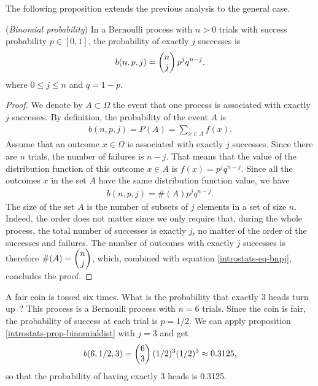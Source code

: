 The following proposition extends the previous analysis to the 
general case.

\begin{proposition}
(\emph{Binomial probability})
\label{introstats-prop-binomialdist}
In a Bernoulli process with $n>0$ trials with success probability $p\in[0,1]$, the probability
of exactly $j$ successes is 
\begin{eqnarray}
b(n,p,j) = \choosefun{n}{j} p^j q^{n-j},
\end{eqnarray}
where $0\leq j \leq n$ and $q=1-p$.
\end{proposition}

\begin{proof}
We denote by $A\subset \Omega$ the event that one process is associated with exactly $j$ successes. 
By definition, the probability of the event $A$ is 
\begin{eqnarray}
b(n,p,j) = P(A) = \sum_{x\in A} f(x).
\end{eqnarray}
Assume that an outcome $x\in \Omega$ is associated with exactly $j$ successes. Since there are 
$n$ trials, the number of failures is $n-j$. That means that the value of the distribution
function of this outcome $x\in A$ is $f(x) = p^j q^{n-j}$.
Since all the outcomes $x$ in the set $A$ have the same distribution function value, 
we have
\begin{eqnarray}
\label{introstats-eq-bnpj}
b(n,p,j) = \#(A) p^j q^{n-j}.
\end{eqnarray}
The size of the set $A$ is the number of subsets of $j$ elements in a set of size $n$.
Indeed, the order does not matter since we only require that, during the whole 
process, the total number of successes is exactly $j$, no matter of the order 
of the successes and failures.
The number of outcomes with exactly $j$ successes is therefore $\#(A)=\choosefun{n}{j}$,
which, combined with equation \ref{introstats-eq-bnpj}, concludes the proof. 
\end{proof}

\begin{example}
A fair coin is tossed six times. What is the probability that 
exactly 3 heads turn up~? This process is a Bernoulli process
with $n=6$ trials. Since the coin is fair, the probability 
of success at each trial is $p=1/2$. We can apply proposition \ref{introstats-prop-binomialdist}
with $j=3$ and get 
\begin{eqnarray}
b(6,1/2,3) = \choosefun{6}{3} (1/2)^3 (1/2)^3 \approx 0.3125,
\end{eqnarray}
so that the probability of having exactly 3 heads is 0.3125.
\end{example}

